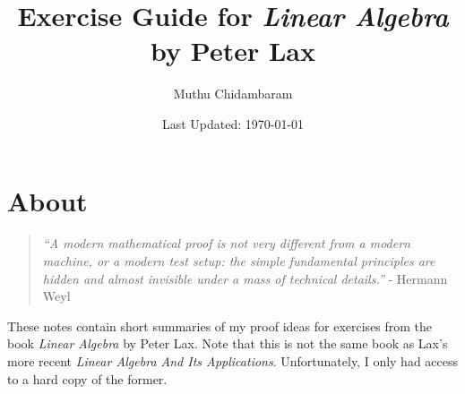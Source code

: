 \documentclass{article}
\begin{document}
\title{Exercise Guide for \textit{Linear Algebra} by Peter Lax}
\author{Muthu Chidambaram}
\date{Last Updated: \today}

\maketitle

\tableofcontents
\newpage 

\section*{About}

\begin{quote}
        \textit{``A modern mathematical proof is not very different from a modern machine,
or a modern test setup: the simple fundamental principles are hidden 
and almost invisible under a mass of technical details.''} - Hermann Weyl
\end{quote}

These notes contain short summaries of my proof ideas for exercises
from the book \textit{Linear Algebra} by Peter Lax.
Note that this is not the same book as Lax's more recent \textit{Linear Algebra And Its Applications}.
Unfortunately, I only had access to a hard copy of the former.










\end{document}
